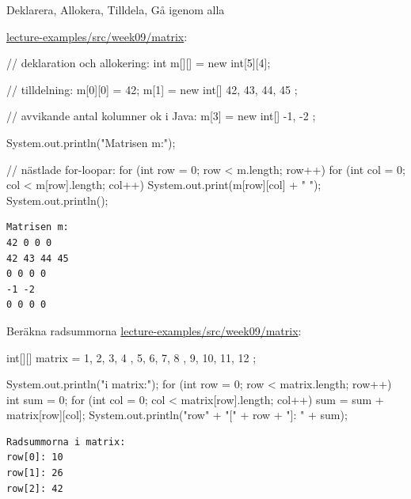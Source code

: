 \documentclass{lecturenotes}
\begin{document}
\begin{Slide}{Deklarera, Allokera, Tilldela, Gå igenom alla}
  \begin{minipage}{0.7\linewidth}   
\footnotesize\href{https://github.com/bjornregnell/lth-eda016-2015/tree/master/lectures/examples/eclipse-ws/lecture-examples/src/week09}{lecture-examples/src/week09/matrix}:

\begin{Code}[basicstyle=\ttfamily\fontsize{7}{8}\selectfont, numberstyle=,numbers=left]
// deklaration och allokering:
int m[][] = new int[5][4];
        
// tilldelning:
m[0][0] = 42;
m[1] = new int[] { 42, 43, 44, 45 };

// avvikande antal kolumner ok i Java:
m[3] = new int[] { -1, -2 }; 
        
System.out.println("Matrisen m:");

// nästlade for-loopar:        
for (int row = 0; row < m.length; row++) {
    for (int col = 0; col < m[row].length; col++) {
        System.out.print(m[row][col] + " ");
    }
    System.out.println();
}
\end{Code}
\end{minipage}
\hspace{0.5cm}
\begin{minipage}[t]{0.2\linewidth}   
\begin{verbatim}
Matrisen m:
42 0 0 0 
42 43 44 45 
0 0 0 0 
-1 -2 
0 0 0 0 
\end{verbatim}
  \end{minipage}
\end{Slide}

\begin{Slide}{Beräkna radsummorna}
\footnotesize\href{https://github.com/bjornregnell/lth-eda016-2015/tree/master/lectures/examples/eclipse-ws/lecture-examples/src/week09}{lecture-examples/src/week09/matrix}:
\begin{Code}[numberstyle=,numbers=left]
        int[][] matrix = { { 1, 2, 3, 4 }, { 5, 6, 7, 8 }, {9, 10, 11, 12} };
        
        System.out.println("\nRadsummorna i matrix:");
        for (int row = 0; row < matrix.length; row++) {
            int sum = 0;
            for (int col = 0; col < matrix[row].length; col++) {
                sum = sum + matrix[row][col];
            }
            System.out.println("row" + "[" + row + "]: " + sum);
        }        
\end{Code}
\begin{verbatim}
Radsummorna i matrix:
row[0]: 10
row[1]: 26
row[2]: 42
\end{verbatim}
\end{Slide}
\end{document}
